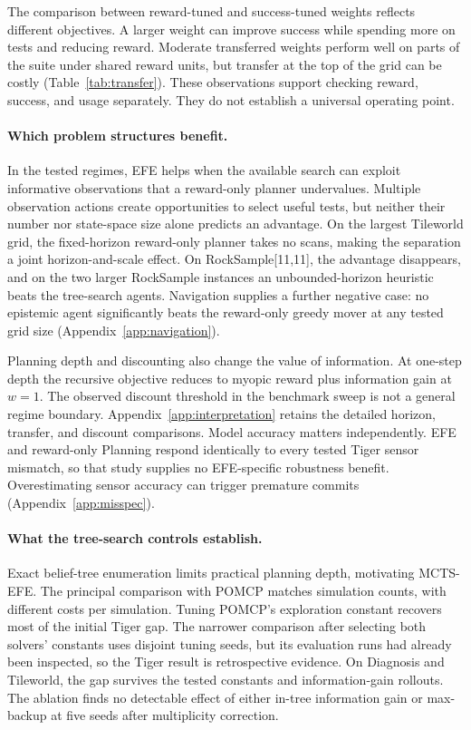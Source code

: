 The comparison between reward-tuned and success-tuned weights reflects different objectives. A larger weight can improve success while spending more on tests and reducing reward. Moderate transferred weights perform well on parts of the suite under shared reward units, but transfer at the top of the grid can be costly (Table~\ref{tab:transfer}). These observations support checking reward, success, and usage separately. They do not establish a universal operating point.

\paragraph{Which problem structures benefit.}
In the tested regimes, EFE helps when the available search can exploit informative observations that a reward-only planner undervalues. Multiple observation actions create opportunities to select useful tests, but neither their number nor state-space size alone predicts an advantage. On the largest Tileworld grid, the fixed-horizon reward-only planner takes no scans, making the separation a joint horizon-and-scale effect. On RockSample[11,11], the advantage disappears, and on the two larger RockSample instances an unbounded-horizon heuristic beats the tree-search agents. Navigation supplies a further negative case: no epistemic agent significantly beats the reward-only greedy mover at any tested grid size (Appendix~\ref{app:navigation}).

Planning depth and discounting also change the value of information. At one-step depth the recursive objective reduces to myopic reward plus information gain at $w=1$. The observed discount threshold in the benchmark sweep is not a general regime boundary. Appendix~\ref{app:interpretation} retains the detailed horizon, transfer, and discount comparisons. Model accuracy matters independently. EFE and reward-only Planning respond identically to every tested Tiger sensor mismatch, so that study supplies no EFE-specific robustness benefit. Overestimating sensor accuracy can trigger premature commits (Appendix~\ref{app:misspec}).

\paragraph{What the tree-search controls establish.}
Exact belief-tree enumeration limits practical planning depth, motivating MCTS-EFE. The principal comparison with POMCP matches simulation counts, with different costs per simulation. Tuning POMCP's exploration constant recovers most of the initial Tiger gap. The narrower comparison after selecting both solvers' constants uses disjoint tuning seeds, but its evaluation runs had already been inspected, so the Tiger result is retrospective evidence. On Diagnosis and Tileworld, the gap survives the tested constants and information-gain rollouts. The ablation finds no detectable effect of either in-tree information gain or max-backup at five seeds after multiplicity correction.

